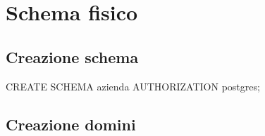 \chapter{Schema fisico}
    \section{Creazione schema}
        \ttfamily
            \begin{flushleft}
                \begin{description}
                    \item CREATE SCHEMA azienda AUTHORIZATION postgres;
                \end{description}
            \end{flushleft}
        \normalfont

    \section{Creazione domini}
        \ttfamily
